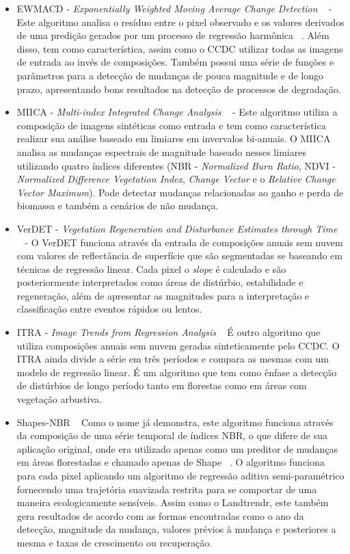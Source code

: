 \documentclass[twocolumn]{article}
\begin{document}
\begin{itemize}
  \item EWMACD - \textit{Exponentially Weighted Moving Average Change Detection} ~\cite{Brooks2014} - Este algoritmo analisa o resíduo entre o pixel observado e os valores derivados de uma predição gerados por um processo de regressão harmônica ~\cite{Brooks2012}. Além disso, tem como característica, assim como o CCDC utilizar todas as imagens de entrada ao invés de composições. Também possui uma série de funções e parâmetros para a detecção de mudanças de pouca magnitude e de longo prazo, apresentando bons resultados na detecção de processos de degradação.
  
  \item MIICA - \textit{Multi-index Integrated Change Analysis} ~\cite{JIN2013159} - Este algoritmo utiliza a composição de imagens sintéticas como entrada e tem como característica realizar sua análise baseado em limiares em invervalos bi-anuais. O MIICA analisa as mudanças espectrais de magnitude baseado nesses limiares utilizando quatro índices diferentes (NBR - \textit{Normalized Burn Ratio}, NDVI - \textit{Normalized Difference Vegetation Index}, \textit{Change Vector} e o \textit{Relative Change Vector Maximum}). Pode detectar mudanças relacionadas ao ganho e perda de biomassa e também a cenários de não mudança.
  
  \item VerDET - \textit{Vegetation Regeneration and Disturbance Estimates through Time} ~\cite{Hughes2017} - O VerDET funciona através da entrada de composições anuais sem nuvem com valores de reflectância de superfície que são segmentadas se baseando em técnicas de regressão linear. Cada pixel o \textit{slope} é calculado e são posteriormente interpretados como áreas de distúrbio, estabilidade e regeneração, além de apresentar as magnitudes para a interpretação e classificação entre eventos rápidos ou lentos.
  
  
  \item ITRA - \textit{Image Trends from Regression Analysis} ~\cite{VOGELMANN201292} É outro algoritmo que utiliza composições anuais sem nuvem geradas sinteticamente pelo CCDC. O ITRA ainda divide a série em três períodos e compara as mesmas com um modelo de regressão linear. É um algoritmo que tem como ênfase a detecção de distúrbios de longo período tanto em florestas como em áreas com vegetação arbustiva.
  
  \item Shapes-NBR ~\cite{Meyer2013, Moisen2016} Como o nome já demonstra, este algoritmo funciona através da composição de uma série temporal de índices NBR, o que difere de sua aplicação original, onde era utilizado apenas como um preditor de mudanças em áreas florestadas e chamado apenas de Shape ~\cite{SCHROEDER2017230}. O algoritmo funciona para cada pixel aplicando um algoritmo de regressão aditiva semi-paramétrico fornecendo uma trajetória suavizada restrita para se comportar de uma maneira ecologicamente sensíveis. Assim como o Landtrendr, este também gera resultados de acordo com as formas encontradas como o ano da detecção, magnitude da mudança, valores prévios à mudança e posteriores a mesma e taxas de crescimento ou recuperação.
  
\end{itemize}
\end{document}
